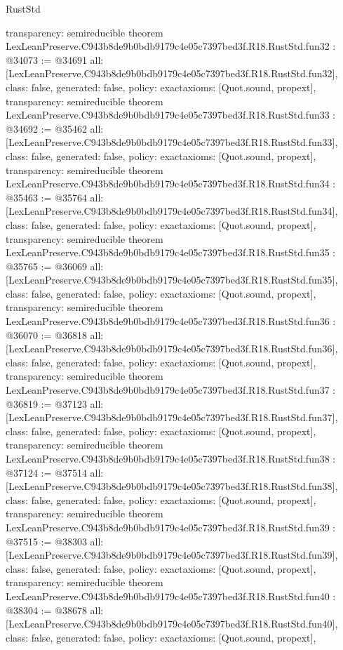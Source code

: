 \begin{lexlean}{RustStd}
\begin{coremodule}
{  transparency: semireducible
}
theorem LexLeanPreserve.C943b8de9b0bdb9179c4e05c7397bed3f.R18.RustStd.fun32 : @34073 := @34691 {
  all: [LexLeanPreserve.C943b8de9b0bdb9179c4e05c7397bed3f.R18.RustStd.fun32],
  class: false,
  generated: false,
  policy: exact{axioms: [Quot.sound, propext]},
  transparency: semireducible
}
theorem LexLeanPreserve.C943b8de9b0bdb9179c4e05c7397bed3f.R18.RustStd.fun33 : @34692 := @35462 {
  all: [LexLeanPreserve.C943b8de9b0bdb9179c4e05c7397bed3f.R18.RustStd.fun33],
  class: false,
  generated: false,
  policy: exact{axioms: [Quot.sound, propext]},
  transparency: semireducible
}
theorem LexLeanPreserve.C943b8de9b0bdb9179c4e05c7397bed3f.R18.RustStd.fun34 : @35463 := @35764 {
  all: [LexLeanPreserve.C943b8de9b0bdb9179c4e05c7397bed3f.R18.RustStd.fun34],
  class: false,
  generated: false,
  policy: exact{axioms: [Quot.sound, propext]},
  transparency: semireducible
}
theorem LexLeanPreserve.C943b8de9b0bdb9179c4e05c7397bed3f.R18.RustStd.fun35 : @35765 := @36069 {
  all: [LexLeanPreserve.C943b8de9b0bdb9179c4e05c7397bed3f.R18.RustStd.fun35],
  class: false,
  generated: false,
  policy: exact{axioms: [Quot.sound, propext]},
  transparency: semireducible
}
theorem LexLeanPreserve.C943b8de9b0bdb9179c4e05c7397bed3f.R18.RustStd.fun36 : @36070 := @36818 {
  all: [LexLeanPreserve.C943b8de9b0bdb9179c4e05c7397bed3f.R18.RustStd.fun36],
  class: false,
  generated: false,
  policy: exact{axioms: [Quot.sound, propext]},
  transparency: semireducible
}
theorem LexLeanPreserve.C943b8de9b0bdb9179c4e05c7397bed3f.R18.RustStd.fun37 : @36819 := @37123 {
  all: [LexLeanPreserve.C943b8de9b0bdb9179c4e05c7397bed3f.R18.RustStd.fun37],
  class: false,
  generated: false,
  policy: exact{axioms: [Quot.sound, propext]},
  transparency: semireducible
}
theorem LexLeanPreserve.C943b8de9b0bdb9179c4e05c7397bed3f.R18.RustStd.fun38 : @37124 := @37514 {
  all: [LexLeanPreserve.C943b8de9b0bdb9179c4e05c7397bed3f.R18.RustStd.fun38],
  class: false,
  generated: false,
  policy: exact{axioms: [Quot.sound, propext]},
  transparency: semireducible
}
theorem LexLeanPreserve.C943b8de9b0bdb9179c4e05c7397bed3f.R18.RustStd.fun39 : @37515 := @38303 {
  all: [LexLeanPreserve.C943b8de9b0bdb9179c4e05c7397bed3f.R18.RustStd.fun39],
  class: false,
  generated: false,
  policy: exact{axioms: [Quot.sound, propext]},
  transparency: semireducible
}
theorem LexLeanPreserve.C943b8de9b0bdb9179c4e05c7397bed3f.R18.RustStd.fun40 : @38304 := @38678 {
  all: [LexLeanPreserve.C943b8de9b0bdb9179c4e05c7397bed3f.R18.RustStd.fun40],
  class: false,
  generated: false,
  policy: exact{axioms: [Quot.sound, propext]},
}
\end{coremodule}
\end{lexlean}
